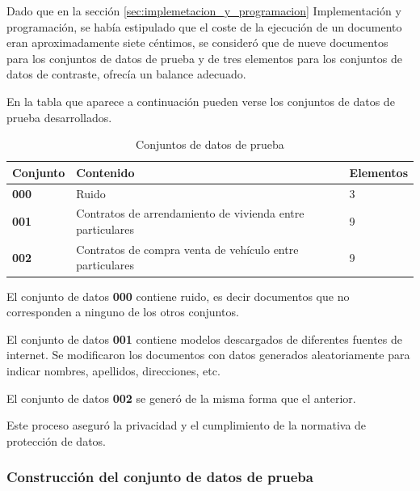 Dado que en la sección \ref{sec:implemetacion_y_programacion} Implementación y programación, se había estipulado
que el coste de la ejecución de un documento eran aproximadamente siete céntimos, se consideró que de nueve documentos
para los conjuntos de datos de prueba y de tres elementos para los conjuntos de datos de contraste, ofrecía un
balance adecuado.

En la tabla que aparece a continuación pueden verse los conjuntos de datos de prueba desarrollados.

\begin{table}[h]
    \renewcommand{\arraystretch}{1.5}
    \setlength{\tabcolsep}{10pt}
    \begin{tabular}{>{\bfseries}p{} p{} p{}}
        \toprule
        \textbf{Conjunto} & \textbf{Contenido}                                        & \textbf{Elementos} \\
        \midrule
        \textbf{000}      & Ruido                                                     & 3                  \\
        \textbf{001}      & Contratos de arrendamiento de vivienda entre particulares & 9                  \\
        \textbf{002}      & Contratos de compra venta de vehículo entre particulares  & 9                  \\
        \bottomrule
    \end{tabular}
    \caption{Conjuntos de datos de prueba}
    \label{tab:data_sets}
\end{table}

El conjunto de datos \textbf{000} contiene ruido, es decir documentos que no corresponden a ninguno de los
otros conjuntos.

El conjunto de datos \textbf{001} contiene modelos descargados de diferentes fuentes de internet.
Se modificaron los documentos con datos generados aleatoriamente para indicar nombres, apellidos, direcciones, etc.

El conjunto de datos \textbf{002} se generó de la misma forma que el anterior.

Este proceso aseguró la privacidad y el cumplimiento de la normativa de protección de datos.



\subsubsection{Construcción del conjunto de datos de prueba}

